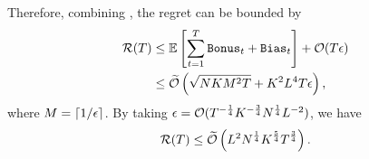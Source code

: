 Therefore, combining , the regret can be bounded by
\begin{align*}
    {\mathcal{R}}(T) &\le \mathbb{E}\left[\sum_{t=1}^T \texttt{Bonus}_t + \texttt{Bias}_t\right] + {\mathcal{O}}(T\epsilon) \\
    &\le \widetilde{{\mathcal{O}}}\left(\sqrt{NKM^2T} + K^2L^4T\epsilon\right),
\end{align*}
where $M = \lceil 1/\epsilon \rceil$. By taking $\epsilon = {\mathcal{O}}(T^{-\frac{1}{4}}K^{-\frac{3}{4}}N^{\frac{1}{4}}L^{-2})$, we have
\begin{align*}
    {\mathcal{R}}(T) \le \widetilde{{\mathcal{O}}} \left( L^2N^{\frac{1}{4}}K^{\frac{5}{4}}T^{\frac{3}{4}} \right).
\end{align*}


